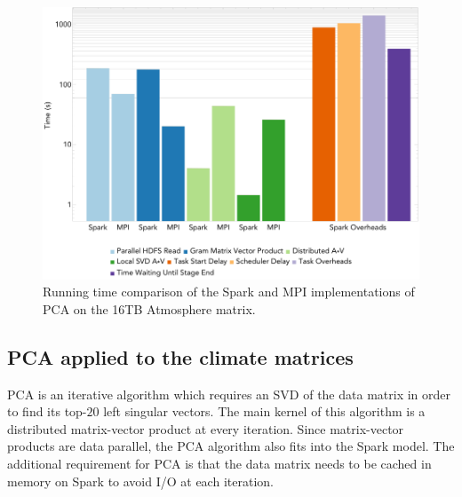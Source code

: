 \begin{figure}[th!]
\centering
\includegraphics[width=\textwidth]{fig/hero_pca_times.png}
\caption{Running time comparison of the Spark and MPI implementations of PCA on the 16TB Atmosphere matrix.}
\label{fig:hero}
\end{figure}

\subsection{PCA applied to the climate matrices}

PCA is an iterative algorithm which requires an SVD of the data matrix in order to find its top-$20$ left singular vectors. The main kernel of this algorithm is a distributed matrix-vector product at every iteration. Since matrix-vector products are data parallel, the PCA algorithm also fits into the Spark model. The additional requirement for PCA is that the data matrix needs to be cached in memory on Spark to avoid I/O at each iteration.

